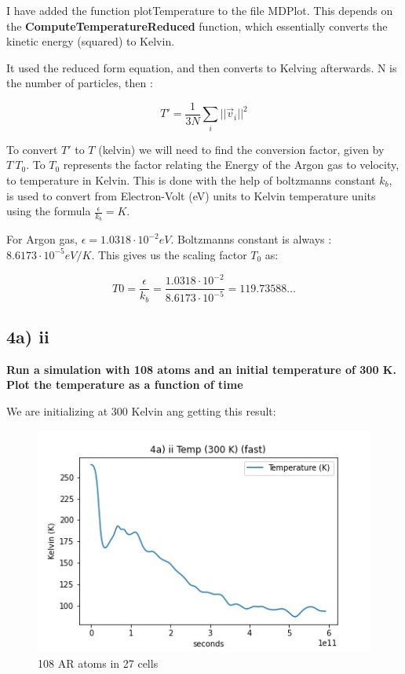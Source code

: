 \documentclass[a4paper,10pt,english]{article}
\begin{document}
I have added the function plotTemperature to the file MDPlot.  This depends on the \textbf{ComputeTemperatureReduced} function, which essentially converts the kinetic energy (squared) to Kelvin.

It used the reduced form equation, and then converts to Kelving afterwards. N is the number of particles, then :

\begin{equation}
T' = \frac{1}{3N} \sum_i  || \vec{v}_i||^2
\end{equation}

To convert $T'$ to $T$ (kelvin) we will need to find the conversion factor, given by  $T \ T_0$. To $T_0$ represents the  factor relating the Energy of the Argon gas to velocity, to temperature in Kelvin. This is done with the help of boltzmanns constant $k_b$, is used to convert from Electron-Volt (eV) units to Kelvin temperature units using the formula $\frac{\epsilon}{k_b} = K$.

For Argon gas, $\epsilon = 1.0318 \cdot 10^{-2} eV $. Boltzmanns constant is always : $8.6173 \cdot 10^{-5} eV/K$. This gives us the scaling factor $T_0$ as:

\begin{equation}
T0 = \frac{\epsilon}{k_b} = \frac{ 1.0318 \cdot 10^{-2} }{8.6173 \cdot 10^{-5}} = 119.73588\dots 
\end{equation}


\subsection*{4a) ii }
\textbf{Run a simulation with 108 atoms and an initial temperature of 300 K. Plot the temperature as a
function of time}

We are initializing at 300 Kelvin ang getting this result:

\begin{figure}[h!]
        \centering 
        \includegraphics[scale=0.6]{./py/img/4a_ii_fast.jpg} 
        \caption{108 AR atoms in 27 cells }
        \label{fig:3biv}
\end{figure}
\end{document}
